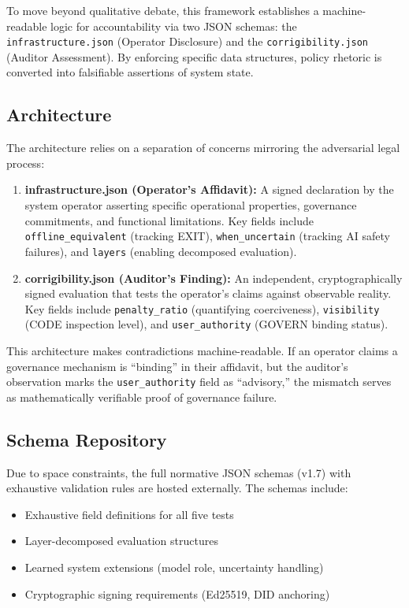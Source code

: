 \documentclass{article}
\begin{document}
\medskip

To move beyond qualitative debate, this framework establishes a machine-readable logic for accountability via two JSON schemas: the \texttt{infrastructure.json} (Operator Disclosure) and the \texttt{corrigibility.json} (Auditor Assessment). By enforcing specific data structures, policy rhetoric is converted into falsifiable assertions of system state.

\subsection{Architecture}

The architecture relies on a separation of concerns mirroring the adversarial legal process:

\begin{enumerate}[noitemsep]
    \item \textbf{infrastructure.json (Operator's Affidavit):} A signed declaration by the system operator asserting specific operational properties, governance commitments, and functional limitations. Key fields include \texttt{offline\_equivalent} (tracking EXIT), \texttt{when\_uncertain} (tracking AI safety failures), and \texttt{layers} (enabling decomposed evaluation).

    \item \textbf{corrigibility.json (Auditor's Finding):} An independent, cryptographically signed evaluation that tests the operator's claims against observable reality. Key fields include \texttt{penalty\_ratio} (quantifying coerciveness), \texttt{visibility} (CODE inspection level), and \texttt{user\_authority} (GOVERN binding status).
\end{enumerate}

This architecture makes contradictions machine-readable. If an operator claims a governance mechanism is ``binding'' in their affidavit, but the auditor's observation marks the \texttt{user\_authority} field as ``advisory,'' the mismatch serves as mathematically verifiable proof of governance failure.

\subsection{Schema Repository}

Due to space constraints, the full normative JSON schemas (v1.7) with exhaustive validation rules are hosted externally. The schemas include:

\begin{itemize}[noitemsep]
    \item Exhaustive field definitions for all five tests
    \item Layer-decomposed evaluation structures
    \item Learned system extensions (model role, uncertainty handling)
    \item Cryptographic signing requirements (Ed25519, DID anchoring)
\end{itemize}
\end{document}
